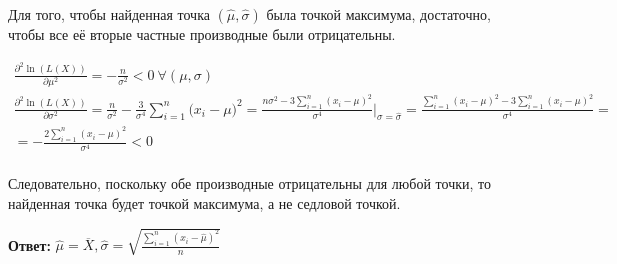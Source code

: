 {}\documentclass{article}
\begin{document}
    Для того, чтобы найденная точка $(\hat{\mu}, \hat{\sigma})$ была точкой максимума, достаточно, чтобы все её вторые частные производные были отрицательны.

    \begin{gather*}
        \frac{\partial^2 \ln(L(X))}{\partial \mu^2} = -\frac{n}{\sigma^2} < 0 \ \forall (\mu, \sigma)\\
        \frac{\partial^2 \ln(L(X))}{\partial \sigma^2} = \frac{n}{\sigma^2} - \frac{3}{\sigma^4} \sum_{i=1}^n \bigg( x_i - \mu \bigg)^2 =
    \frac{n\sigma^2 - 3\sum_{i=1}^n (x_i - \mu)^2 }{\sigma^4} \bigg |_{\sigma = \hat{\sigma}} =
    \frac{\sum_{i=1}^n (x_i - \mu)^2 - 3\sum_{i=1}^n (x_i - \mu)^2 }{\sigma^4} =\\
        = -\frac{2\sum_{i=1}^n (x_i - \mu)^2}{\sigma^4} < 0\\
    \end{gather*}

Следовательно, поскольку обе производные отрицательны для любой точки, то найденная точка будет точкой максимума, а не седловой точкой.



\textbf{Ответ:} $\hat{\mu} = \overline{X}, \hat{\sigma} = \sqrt{\frac{\sum_{i=1}^n(x_i - \hat{\mu})^2}{n}}$
\end{document}
